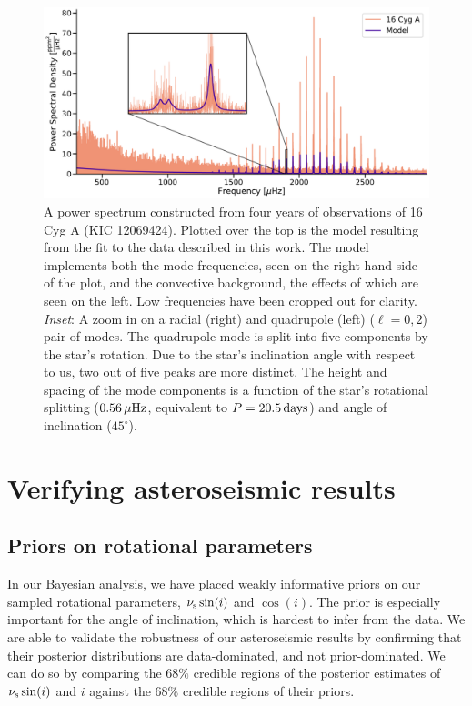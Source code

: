  \begin{figure}
	\centering
	\includegraphics[width=.99\textwidth]{Images/modelfit.pdf}
	\caption{A power spectrum constructed from four years of \kepler observations of 16 Cyg A (KIC 12069424). Plotted over the top is the model resulting from the fit to the data described in this work. The model implements both the mode frequencies, seen on the right hand side of the plot, and the convective background, the effects of which are seen on the left. Low frequencies have been cropped out for clarity. \textit{Inset}: A zoom in on a radial (right) and quadrupole (left) ($\ell = 0, 2$) pair of modes. The quadrupole mode is split into five components by the star's rotation. Due to the star's inclination angle with respect to us, two out of five peaks are more distinct. The height and spacing of the mode components is a function of the star's rotational splitting ($0.56\, \mu\rm{Hz}$, equivalent to $P = 20.5\, \rm{days}$) and angle of inclination ($45^\circ$).}
	\label{fig:modelfit}
\end{figure}


\section{Verifying asteroseismic results}
\subsection{Priors on rotational parameters}
In our Bayesian analysis, we have placed weakly informative priors on our sampled rotational parameters, $\nu_{\rm s}\sin(i)$ and $\cos(i)$. The prior is especially important for the angle of inclination, which is hardest to infer from the data. We are able to validate the robustness of our asteroseismic results by confirming that their posterior distributions are data-dominated, and not prior-dominated. We can do so by comparing the $68\%$ credible regions of the posterior estimates of $\nu_{\rm s}\sin(i)$ and $i$ against the $68\%$ credible regions of their priors.

